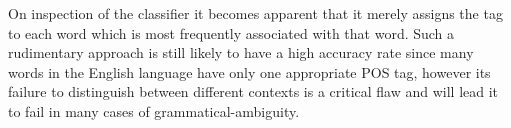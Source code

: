 \documentclass[../main.tex]{subfiles}
\begin{document}
On inspection of the classifier it becomes apparent that it merely assigns the tag to each word which is most frequently associated with that word.
Such a rudimentary approach is still likely to have a high accuracy rate since many words in the English language have only one appropriate POS tag, however its failure to distinguish between different contexts is a critical flaw and will lead it to fail in many cases of grammatical-ambiguity.



\end{document}
